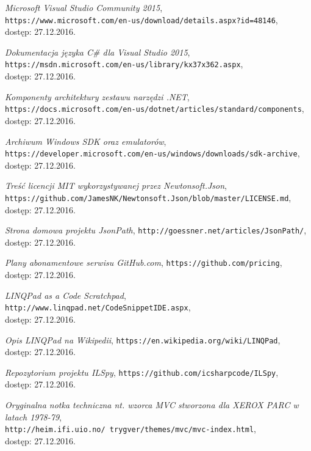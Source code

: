 \documentclass[a4paper,twoside,titlepage,openright]{book}
\begin{document}
\begin{thebibliography}{99}
 \textit{Microsoft Visual Studio Community 2015}, \\
\texttt{https://www.microsoft.com/en-us/download/details.aspx?id=48146}, \\dostęp: 27.12.2016.

 \textit{Dokumentacja języka C\# dla Visual Studio 2015}, \\
\texttt{https://msdn.microsoft.com/en-us/library/kx37x362.aspx}, \\dostęp: 27.12.2016.

 \textit{Komponenty architektury zestawu narzędzi .NET}, \\
\texttt{https://docs.microsoft.com/en-us/dotnet/articles/standard/components},\\ dostęp: 27.12.2016.

 \textit{Archiwum Windows SDK oraz emulatorów}, \\
\texttt{https://developer.microsoft.com/en-us/windows/downloads/sdk-archive}, \\dostęp: 27.12.2016.

 \textit{Treść licencji MIT wykorzystywanej przez Newtonsoft.Json}, \\
\texttt{https://github.com/JamesNK/Newtonsoft.Json/blob/master/LICENSE.md}, \\dostęp: 27.12.2016.

 \textit{Strona domowa projektu JsonPath}, 
\texttt{http://goessner.net/articles/JsonPath/}, \\dostęp: 27.12.2016.

 \textit{Plany abonamentowe serwisu GitHub.com}, 
\texttt{https://github.com/pricing}, \\dostęp: 27.12.2016.

 \textit{LINQPad as a Code Scratchpad}, 
\texttt{http://www.linqpad.net/CodeSnippetIDE.aspx}, \\dostęp: 27.12.2016.

 \textit{Opis LINQPad na Wikipedii}, 
\texttt{https://en.wikipedia.org/wiki/LINQPad}, \\dostęp: 27.12.2016.

 \textit{Repozytorium projektu ILSpy}, 
\texttt{https://github.com/icsharpcode/ILSpy}, \\dostęp: 27.12.2016.

 \textit{Oryginalna notka techniczna nt. wzorca MVC stworzona dla XEROX PARC w latach 1978-79}, \\
\texttt{http://heim.ifi.uio.no/~trygver/themes/mvc/mvc-index.html}, \\dostęp: 27.12.2016.




\end{thebibliography}
\end{document}
